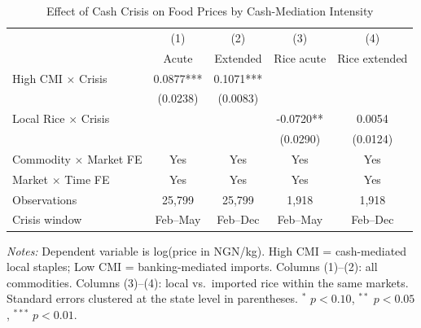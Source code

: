 \begin{table}[t]
\centering
\caption{Effect of Cash Crisis on Food Prices by Cash-Mediation Intensity}
\label{tab:main_did}
\begin{tabular}{lcccc}
\toprule
 & (1) & (2) & (3) & (4) \\
 & Acute & Extended & Rice acute & Rice extended \\
\midrule
High CMI $\times$ Crisis & 0.0877*** & 0.1071*** & & \\
 & (0.0238) & (0.0083) & & \\
Local Rice $\times$ Crisis & & & -0.0720** & 0.0054 \\
 & & & (0.0290) & (0.0124) \\
\midrule
Commodity $\times$ Market FE & Yes & Yes & Yes & Yes \\
Market $\times$ Time FE & Yes & Yes & Yes & Yes \\
Observations & 25,799 & 25,799 & 1,918 & 1,918 \\
Crisis window & Feb--May & Feb--Dec & Feb--May & Feb--Dec \\
\bottomrule
\end{tabular}
\begin{tablenotes}[flushleft]
\small
\item \textit{Notes:} Dependent variable is log(price in NGN/kg). High CMI = cash-mediated local staples; Low CMI = banking-mediated imports. Columns (1)--(2): all commodities. Columns (3)--(4): local vs.\ imported rice within the same markets. Standard errors clustered at the state level in parentheses. $^{*}$ $p<0.10$, $^{**}$ $p<0.05$, $^{***}$ $p<0.01$.
\end{tablenotes}
\end{table}


